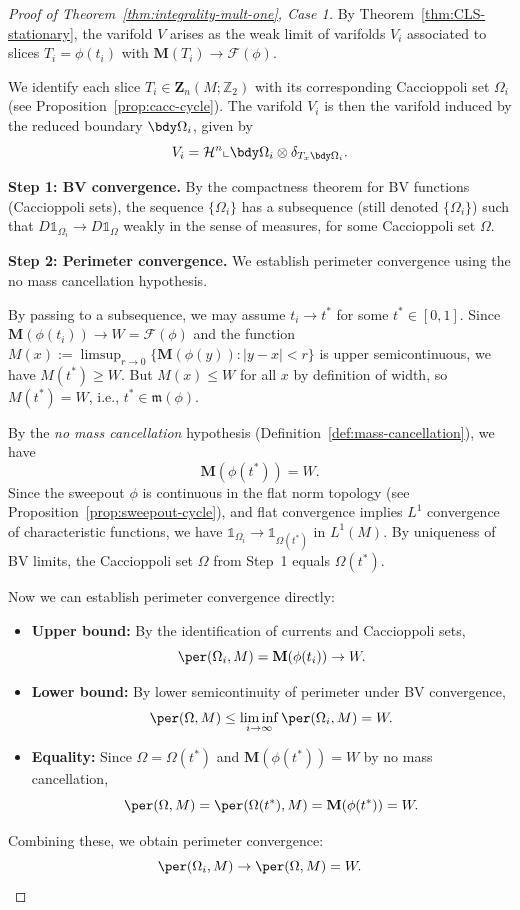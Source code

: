 \begin{proof}[Proof of Theorem~\ref{thm:integrality-mult-one}, Case 1]
By Theorem~\ref{thm:CLS-stationary}, the varifold $V$ arises as the weak limit of varifolds $V_i$
associated to slices $T_i = \phi(t_i)$ with $\mathbf{M}(T_i) \to \mathcal{F}(\phi)$.

We identify each slice $T_i \in \mathbf{Z}_n(M;\mathbb{Z}_2)$ with its corresponding Caccioppoli set
$\Omega_i$ (see Proposition~\ref{prop:cacc-cycle}). The
varifold $V_i$ is then the varifold induced by the reduced boundary $\bdy\Omega_i$, given by
\[
    V_i = \mathcal{H}^n \llcorner \bdy\Omega_i \otimes \delta_{T_x\bdy\Omega_i}.
\]

\textbf{Step 1: BV convergence.} By the compactness theorem for BV functions (Caccioppoli sets), the
sequence $\{\Omega_i\}$ has a subsequence (still denoted $\{\Omega_i\}$) such that
$D\mathbb{1}_{\Omega_i} \to D\mathbb{1}_\Omega$ weakly in the sense of measures, for some
Caccioppoli set $\Omega$.

\textbf{Step 2: Perimeter convergence.} We establish perimeter convergence using the no mass cancellation hypothesis.

By passing to a subsequence, we may assume $t_i \to t^*$ for some $t^* \in [0,1]$. Since $\mathbf{M}(\phi(t_i)) \to W = \mathcal{F}(\phi)$ and the function $M(x) := \limsup_{r \to 0} \{\mathbf{M}(\phi(y)) : |y - x| < r\}$ is upper semicontinuous, we have $M(t^*) \geq W$. But $M(x) \leq W$ for all $x$ by definition of width, so $M(t^*) = W$, i.e., $t^* \in \mathfrak{m}(\phi)$.

By the \emph{no mass cancellation} hypothesis (Definition~\ref{def:mass-cancellation}), we have
\[
    \mathbf{M}(\phi(t^*)) = W.
\]
Since the sweepout $\phi$ is continuous in the flat norm topology (see Proposition~\ref{prop:sweepout-cycle}), and flat convergence implies $L^1$ convergence of characteristic functions, we have $\mathbb{1}_{\Omega_i} \to \mathbb{1}_{\Omega(t^*)}$ in $L^1(M)$. By uniqueness of BV limits, the Caccioppoli set $\Omega$ from Step~1 equals $\Omega(t^*)$.

Now we can establish perimeter convergence directly:
\begin{itemize}
    \item \textbf{Upper bound:} By the identification of currents and Caccioppoli sets,
    \[
        \per(\Omega_i, M) = \mathbf{M}(\phi(t_i)) \to W.
    \]
    \item \textbf{Lower bound:} By lower semicontinuity of perimeter under BV convergence,
    \[
        \per(\Omega, M) \leq \liminf_{i \to \infty} \per(\Omega_i, M) = W.
    \]
    \item \textbf{Equality:} Since $\Omega = \Omega(t^*)$ and $\mathbf{M}(\phi(t^*)) = W$ by no mass cancellation,
    \[
        \per(\Omega, M) = \per(\Omega(t^*), M) = \mathbf{M}(\phi(t^*)) = W.
    \]
\end{itemize}
Combining these, we obtain perimeter convergence:
\[
    \per(\Omega_i, M) \to \per(\Omega, M) = W.
\]


\end{proof}
